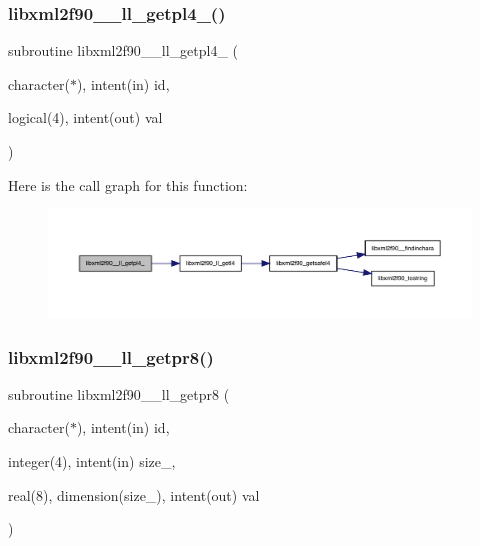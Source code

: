 \subsubsection{\texorpdfstring{libxml2f90\+\_\+\+\_\+ll\+\_\+getpl4\+\_\+()}{libxml2f90\_\_ll\_getpl4\_()}}
{\footnotesize\ttfamily subroutine libxml2f90\+\_\+\+\_\+ll\+\_\+getpl4\+\_\+ (\begin{DoxyParamCaption}\item[{character($\ast$), intent(in)}]{id,  }\item[{logical(4), intent(out)}]{val }\end{DoxyParamCaption})}

Here is the call graph for this function\+:
\nopagebreak
\begin{figure}[H]
\begin{center}
\leavevmode
\includegraphics[width=350pt]{libxml2f90_8f90__pp_8f90_ac77032833d26c0b15ec204a9b8bd5888_cgraph}
\end{center}
\end{figure}
\mbox{\label{libxml2f90_8f90__pp_8f90_a5ffa8a56b1901a92be64556fe9f30e07}} 
\subsubsection{\texorpdfstring{libxml2f90\+\_\+\+\_\+ll\+\_\+getpr8()}{libxml2f90\_\_ll\_getpr8()}}
{\footnotesize\ttfamily subroutine libxml2f90\+\_\+\+\_\+ll\+\_\+getpr8 (\begin{DoxyParamCaption}\item[{character($\ast$), intent(in)}]{id,  }\item[{integer(4), intent(in)}]{size\+\_\+,  }\item[{real(8), dimension(size\+\_\+), intent(out)}]{val }\end{DoxyParamCaption})}

